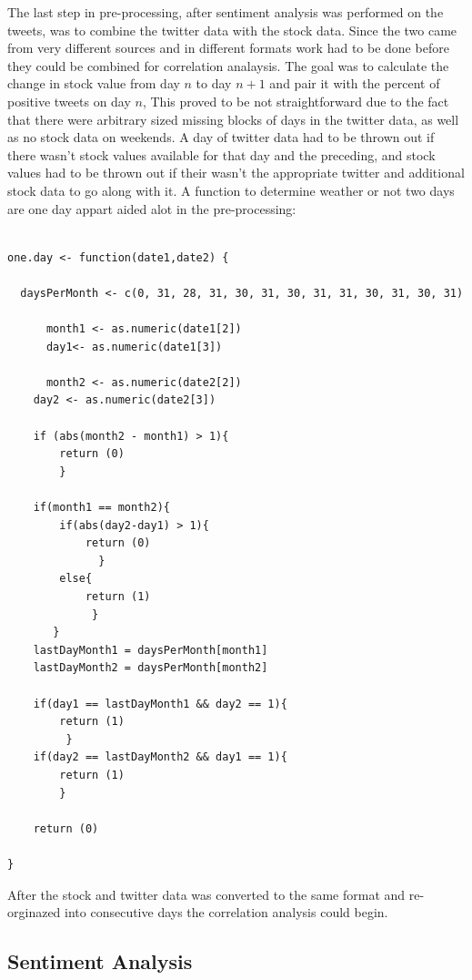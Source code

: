 \documentclass{acm_proc_article-sp}
\begin{document}
 The last step in pre-processing, after sentiment analysis was performed on the tweets,
 was to combine the twitter data with the stock data. Since the two came from very different 
 sources and in different formats work had to be done before they could be combined for correlation
 analaysis. The goal was to calculate the change in stock value from day $n$ to day $n+1$ 
 and pair it with the percent of positive tweets on day $n$, This proved to be not straightforward
 due to the fact that there were arbitrary sized missing blocks of days in the twitter data, as well
 as no stock data on weekends. A day of twitter data had to be thrown out if there
 wasn't stock values available for that day and the preceding, and stock values had to be 
 thrown out if their wasn't the appropriate twitter and additional stock data to go along 
 with it. A function to determine weather or not two days are one day appart aided alot in the pre-processing:
 \begin{lstlisting}

one.day <- function(date1,date2) {

  daysPerMonth <- c(0, 31, 28, 31, 30, 31, 30, 31, 31, 30, 31, 30, 31)
       
      month1 <- as.numeric(date1[2])
      day1<- as.numeric(date1[3])

      month2 <- as.numeric(date2[2])
    day2 <- as.numeric(date2[3])

    if (abs(month2 - month1) > 1){
        return (0)
        }

    if(month1 == month2){
        if(abs(day2-day1) > 1){
            return (0)
              }
        else{
            return (1)
             }
       }
    lastDayMonth1 = daysPerMonth[month1]
    lastDayMonth2 = daysPerMonth[month2]

    if(day1 == lastDayMonth1 && day2 == 1){
        return (1)
         }
    if(day2 == lastDayMonth2 && day1 == 1){
        return (1)
        }

    return (0)

}

 \end{lstlisting}
After the stock and twitter data was converted to the same format and re-orginazed into consecutive 
days the correlation analysis could begin. 

\subsection{Sentiment Analysis}
\end{document}
